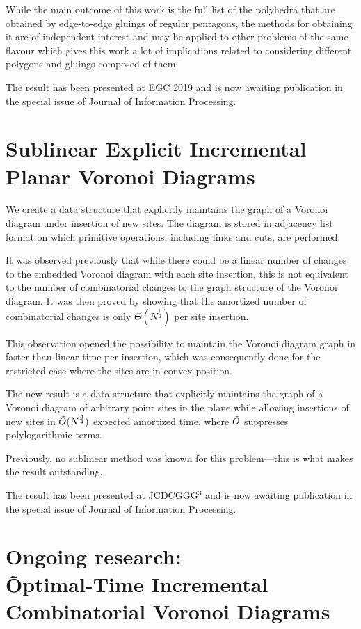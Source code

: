 \documentclass[a4paper,11pt]{article}
\theoremstyle{definition}
\begin{document}
While the main outcome of this work is the full list of the polyhedra that are obtained by edge-to-edge gluings of regular pentagons, the methods for obtaining it are of independent interest and may be applied to other problems of the same flavour which gives this work a lot of implications related to considering different polygons and gluings composed of them.

The result has been presented at EGC 2019 and is now awaiting publication in the special issue of Journal of Information Processing.

\section{Sublinear Explicit Incremental Planar Voronoi Diagrams}

We create a data structure that explicitly maintains the graph of a Voronoi diagram under insertion of new sites. The diagram is stored in adjacency list format on which primitive operations, including links and cuts, are performed.

It was observed previously that while there could be a linear number of changes to the embedded Voronoi diagram with each site insertion, this is not equivalent to the number of combinatorial changes to the graph structure of the Voronoi diagram.
It was then proved by showing that the amortized number of combinatorial changes is only $\Theta(N^{\frac 12})$ per site insertion.

This observation opened the possibility to maintain the Voronoi diagram graph in faster than linear time per insertion, which was consequently done for the restricted case where the sites are in convex position.

The new result is a data structure that explicitly maintains the graph of a Voronoi diagram of arbitrary point sites in the plane while allowing insertions of new sites in $\tilde O (N^{\frac 34})$ expected amortized time, where $\tilde O$ suppresses polylogarithmic terms. 

Previously, no sublinear method was known for this problem—this is what makes the result outstanding.

The result has been presented at JCDCGGG$^3$ and is now awaiting publication in the special issue of Journal of Information Processing.

\section{Ongoing research: \\
	\~Optimal-Time Incremental Combinatorial Voronoi Diagrams}
\end{document}
